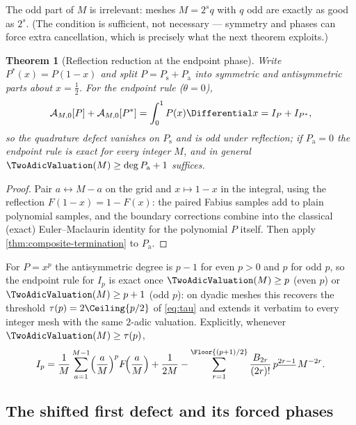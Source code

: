 \documentclass[11pt,oneside]{article}
\numberwithin{equation}{section}
\newtheorem{theorem}{Theorem}[section]
\theoremstyle{definition}
\theoremstyle{remark}
\newcommand{\fall}[2]{#1^{\underline{#2}}}
\begin{document}
The odd part of $M$ is irrelevant: meshes $M=2^{s}q$ with $q$ odd are
exactly as good as $2^{s}$.  (The condition is sufficient, not
necessary --- symmetry and phases can force extra cancellation, which
is precisely what the next theorem exploits.)

\begin{theorem}[Reflection reduction at the endpoint phase]
\label{thm:reflection-reduction}
Write $P^*(x)=P(1-x)$ and split
$P=P_{\mathrm s}+P_{\mathrm a}$ into symmetric and antisymmetric parts
about $x=\tfrac12$.  For the endpoint rule ($\theta=0$),
\begin{equation}
 \mathcal A_{M,0}[P]+\mathcal A_{M,0}[P^*]=\int_0^1P(x)\Differential x
 =I_P+I_{P^*},
 \label{eq:reflection-pair}
\end{equation}
so the quadrature defect vanishes on $P_{\mathrm s}$ and is odd under
reflection; if $P_{\mathrm a}=0$ the endpoint rule is exact for every
integer $M$, and in general
$\TwoAdicValuation(M)\ge\deg P_{\mathrm a}+1$ suffices.
\end{theorem}

\begin{proof}
Pair $a\leftrightarrow M-a$ on the grid and $x\mapsto1-x$ in the
integral, using the reflection $F(1-x)=1-F(x)$: the paired Fabius
samples add to plain polynomial samples, and the boundary corrections
combine into the classical (exact) Euler--Maclaurin identity for the
polynomial $P$ itself.  Then apply \cref{thm:composite-termination}
to $P_{\mathrm a}$.
\end{proof}

For $P=x^{p}$ the antisymmetric degree is $p-1$ for even $p>0$ and $p$
for odd $p$, so the endpoint rule for $I_p$ is exact once
$\TwoAdicValuation(M)\ge p$ (even $p$) or $\TwoAdicValuation(M)\ge p+1$ (odd $p$): on dyadic
meshes this recovers the threshold $\tau(p)=2\Ceiling{p/2}$ of
\eqref{eq:tau} and extends it verbatim to every integer mesh with the
same $2$-adic valuation.  Explicitly, whenever
$\TwoAdicValuation(M)\ge\tau(p)$,
\begin{equation}
 I_p=\frac1M\sum_{a=1}^{M-1}\Bigl(\frac aM\Bigr)^{p}
 F\!\Bigl(\frac aM\Bigr)
 +\frac1{2M}
 -\sum_{r=1}^{\Floor{(p+1)/2}}
 \frac{B_{2r}}{(2r)!}\,\fall p{2r-1}\,M^{-2r}.
 \label{eq:Ip-composite}
\end{equation}

\subsection{The shifted first defect and its forced phases}
\end{document}
